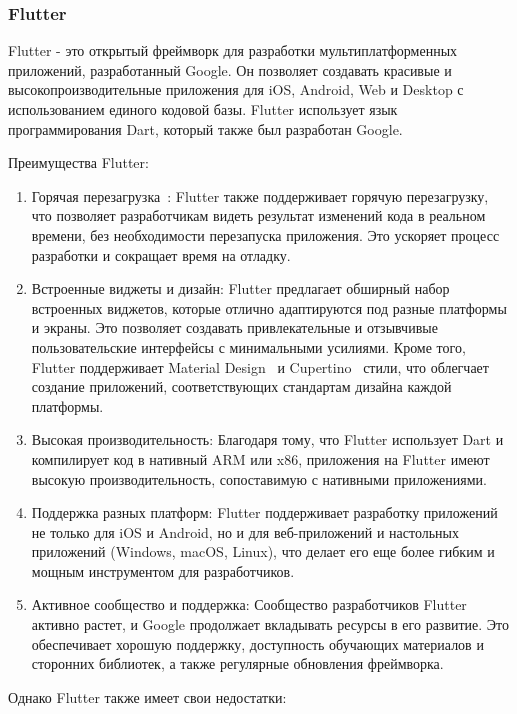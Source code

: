 \documentclass[14pt, russian]{scrartcl}
\begin{document}
\subsubsection{Flutter}

Flutter - это открытый фреймворк для разработки мультиплатформенных приложений, разработанный Google. Он позволяет создавать красивые и высокопроизводительные приложения для iOS, Android, Web и Desktop с использованием единого кодовой базы. Flutter использует язык программирования Dart, который также был разработан Google.

Преимущества Flutter:

\begin{enumerate}
    \item Горячая перезагрузка~\cite{FlutterHotReload}: Flutter также поддерживает горячую перезагрузку, что позволяет разработчикам видеть результат изменений кода в реальном времени, без необходимости перезапуска приложения. Это ускоряет процесс разработки и сокращает время на отладку.
    \item Встроенные виджеты и дизайн: Flutter предлагает обширный набор встроенных виджетов, которые отлично адаптируются под разные платформы и экраны. Это позволяет создавать привлекательные и отзывчивые пользовательские интерфейсы с минимальными усилиями. Кроме того, Flutter поддерживает Material Design~\cite{FlutterMaterial} и Cupertino~\cite{FlutterCupertino} стили, что облегчает создание приложений, соответствующих стандартам дизайна каждой платформы.
    \item Высокая производительность: Благодаря тому, что Flutter использует Dart и компилирует код в нативный ARM или x86, приложения на Flutter имеют высокую производительность, сопоставимую с нативными приложениями.
    \item Поддержка разных платформ: Flutter поддерживает разработку приложений не только для iOS и Android, но и для веб-приложений и настольных приложений (Windows, macOS, Linux), что делает его еще более гибким и мощным инструментом для разработчиков.
    \item Активное сообщество и поддержка: Сообщество разработчиков Flutter активно растет, и Google продолжает вкладывать ресурсы в его развитие. Это обеспечивает хорошую поддержку, доступность обучающих материалов и сторонних библиотек, а также регулярные обновления фреймворка.
\end{enumerate}

Однако Flutter также имеет свои недостатки:
\end{document}
